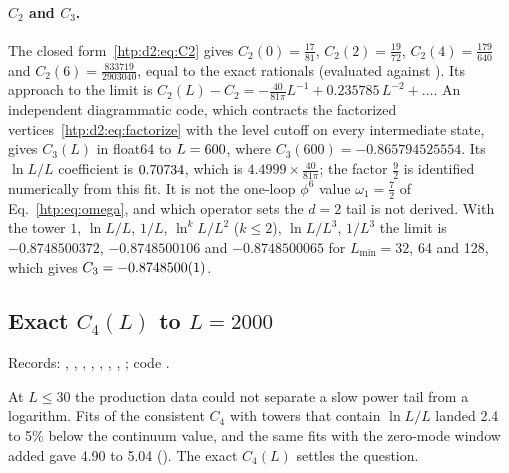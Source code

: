 \paragraph{$C_2$ and $C_3$.} The closed form~\eqref{htp:d2:eq:C2} gives $C_2(0)=\frac{17}{81}$, $C_2(2)=\frac{19}{72}$,
$C_2(4)=\frac{179}{640}$ and $C_2(6)=\frac{833719}{2903040}$, equal to the exact rationals (evaluated against
). Its approach to the limit is
$C_2(L)-C_2=-\frac{40}{81\pi}L^{-1}+0.235785\,L^{-2}+\dots$. An independent diagrammatic code, which contracts the factorized
vertices~\eqref{htp:d2:eq:factorize} with the level cutoff on every intermediate state, gives $C_3(L)$ in float64 to
$L=600$, where $C_3(600)=-0.865794525554$. Its $\ln L/L$ coefficient is $0.70734$, which is
$4.4999\times\frac{40}{81\pi}$; the factor $\frac92$ is identified numerically from this fit. It is not the one-loop $\phi^6$
value $\omega_1=\frac72$ of Eq.~\eqref{htp:eq:omega}, and which operator sets the $d=2$ tail is not derived. With the tower
$1$, $\ln L/L$, $1/L$, $\ln^kL/L^2$ ($k\le2$), $\ln L/L^3$, $1/L^3$ the limit is $-0.8748500372$, $-0.8748500106$ and
$-0.8748500065$ for $L_{\min}=32$, 64 and 128, which gives $C_3=-0.8748500(1)$.

\subsection{Exact \texorpdfstring{$C_4(L)$}{C4(L)} to \texorpdfstring{$L=2000$}{L=2000}}\label{htp:d2:app:c4exact}
{\small\raggedright\noindent Records: , ,
, ,
, ,
, ; code .\par}

At $L\le30$ the production data could not separate a slow power tail from a logarithm. Fits of the consistent $C_4$ with
towers that contain $\ln L/L$ landed 2.4 to 5\% below the continuum value, and the same fits with the zero-mode window added
gave 4.90 to 5.04 (). The exact $C_4(L)$ settles the question.

